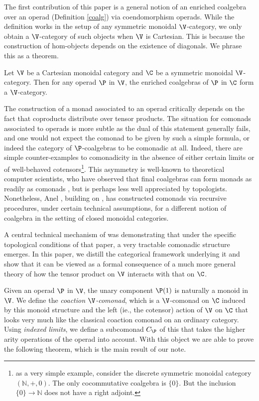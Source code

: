 \documentclass{tac}
\begin{document}
The first contribution of this paper is a general notion of an enriched coalgebra over an operad (Definition \ref{coalg}) via coendomorphism operads. While the definition works in the setup of any symmetric monoidal $\V$-category, we only obtain a $\V$-category of such objects when $\V$ is Cartesian. This is because the construction of hom-objects depends on the existence of diagonals. We phrase this as a theorem.

\begin{theorem}
     Let $\V$ be a Cartesian monoidal category and $\C$ be a symmetric monoidal $\V$-category. Then for any operad $\P$ in $\V$, the enriched coalgebras of $\P$ in $\C$ form a $\V$-category.
\end{theorem}

The construction of a monad associated to an operad critically depends on the fact that coproducts distribute over tensor products. The situation for comonads associated to operads is more subtle as the dual of this statement generally fails, and one would not expect the comonad to be given by such a simple formula, or indeed the category of $\P$-coalgebras to be comonadic at all. Indeed, there are simple counter-examples to comonadicity in the absence of either certain limits or of well-behaved cotensors\footnote{as a very simple example, consider the discrete symmetric monoidal category $(\mathbb N, +, 0)$. The only cocommutative coalgebra is $\{0\}$. But the inclusion $\{0\} \to \mathbb N$ does not have a right adjoint.}. This asymmetry is well-known to theoretical computer scientists,  who have observed that final coalgebras can form monads as readily  as comonads \cite{power01}, but is perhaps less well appreciated by topologists. Nonetheless, Anel \cite{anel14}, building on \cite{smith}, has constructed comonads via recursive procedures, under certain technical assumptions, for a different notion of coalgebra in the setting of closed monoidal categories. 

A central technical mechanism of \cite{me1} was demonstrating that under the specific topological conditions of that paper, a very tractable comonadic structure emerges. In this paper, we distill the categorical framework underlying it and show that it can be viewed as a formal consequence of a much more general theory of how the tensor product on $\V$ interacts with that on $\C$.

Given an operad $\P$ in $\V$, the unary component $\P(1)$ is naturally a monoid in $\V$. We define the \emph{coaction $\V$-comonad}, which is a $\V$-comonad on $\C$ induced by this monoid structure and the left (ie., the cotensor) action of $\V$ on $\C$ that looks very much like the classical coaction comonad on an ordinary category. Using \emph{indexed limits}, we define a subcomonad  $C_\P$ of this that takes the higher arity operations of the operad into account. With this object we are able to prove the following theorem, which is the main result of our note.
 
\end{document}
